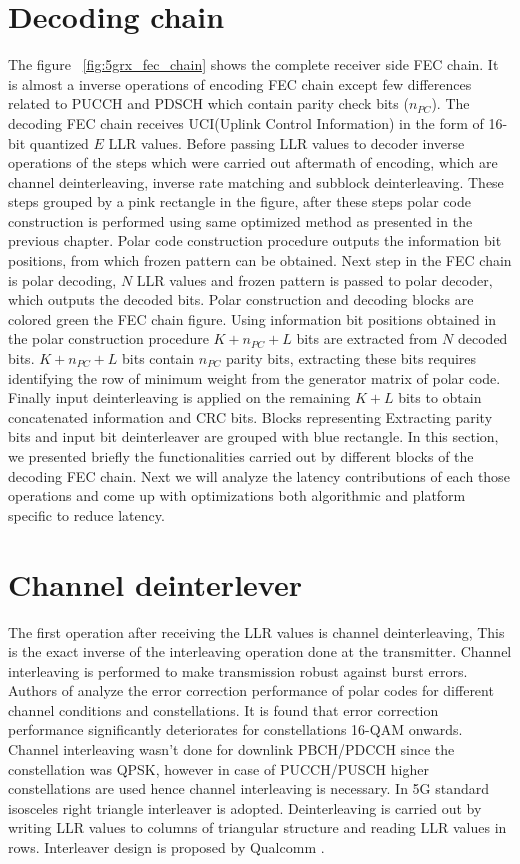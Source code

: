 \section{Decoding chain}
The figure ~\ref{fig:5grx_fec_chain} shows the complete receiver side FEC chain. It is almost a inverse operations of encoding FEC chain except few differences related to PUCCH and PDSCH which contain parity check bits ($ n_{PC} $). The decoding FEC chain receives UCI(Uplink Control Information) in the form of 16-bit quantized $ E $ LLR values. Before passing LLR values to decoder inverse operations of the steps which were carried out aftermath of encoding, which are channel deinterleaving, inverse rate matching and subblock deinterleaving. These steps grouped by a pink rectangle in the figure, after these steps polar code construction is performed using same optimized method as presented in the previous chapter. Polar code construction procedure outputs the information bit positions, from which frozen pattern can be obtained. Next step in the FEC chain is polar decoding, $ N $ LLR values and frozen pattern is passed to polar decoder, which outputs the decoded bits. Polar construction and decoding blocks are colored green the FEC chain figure. Using information bit positions obtained in the polar construction procedure $ K + n_{PC} + L $ bits are extracted from $ N $ decoded bits. $ K + n_{PC} + L $ bits contain $ n_{PC} $ parity bits, extracting these bits requires identifying the row of minimum weight from the generator matrix of polar code. Finally input deinterleaving is applied on the remaining $ K +  L $ bits to obtain concatenated information and CRC bits. Blocks representing Extracting parity bits and input bit deinterleaver are grouped with blue rectangle. In this section, we presented briefly the functionalities carried out by different blocks of the decoding FEC chain. Next we will analyze the latency contributions of each those operations and come up with optimizations both algorithmic and platform specific to reduce latency.

\section{Channel deinterlever}
The first operation after receiving the LLR values is channel deinterleaving, This is the exact inverse of the interleaving operation done at the transmitter. Channel interleaving is performed to make transmission robust against burst errors. Authors of \cite{3gpp.TSG-RAN_WG1} analyze the error correction performance of polar codes for different channel conditions and constellations. It is found that error correction performance significantly deteriorates for constellations 16-QAM onwards. Channel interleaving wasn't done for downlink PBCH/PDCCH since the constellation was QPSK, however in case of PUCCH/PUSCH higher constellations are used hence channel interleaving is necessary. In 5G standard  isosceles right triangle interleaver is adopted. Deinterleaving is carried out by writing LLR values to columns of triangular structure and reading LLR values in rows. Interleaver design is proposed by Qualcomm \cite{3gpp.TSG-RAN_WG1}.

